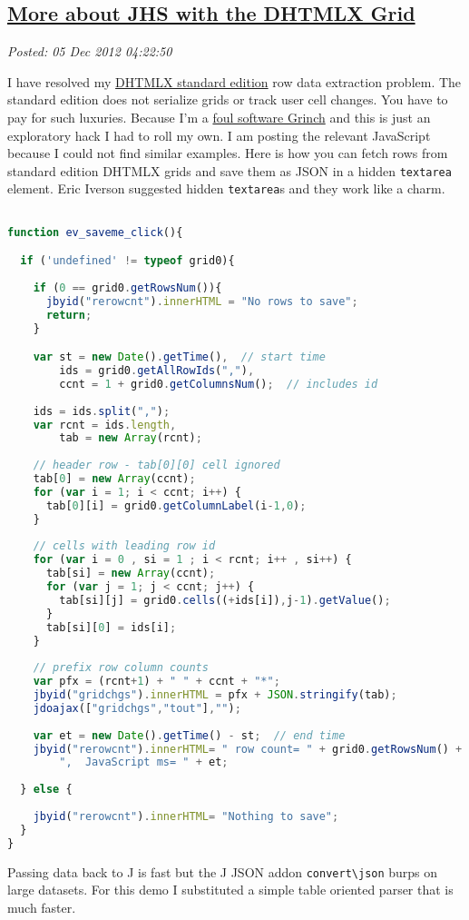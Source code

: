 %

\subsection*{\href{http://bakerjd99.wordpress.com/2012/12/04/more-about-jhs-with-dhtmlx-the-grid/}{More about JHS with the DHTMLX Grid}}


\noindent\emph{Posted: 05 Dec 2012 04:22:50}
\vspace{6pt}

I have resolved my \href{http://dhtmlx.com/docs/download.shtml}{DHTMLX
standard edition} row data extraction problem. The standard edition does
not serialize grids or track user cell changes. You have to pay for such
luxuries. Because I'm a
\href{http://www.youtube.com/watch?v=ZgP0aUKlmNw}{foul software Grinch}
and this is just an exploratory hack I had to roll my own. I am posting
the relevant JavaScript because I could not find similar examples. Here
is how you can fetch rows from standard edition DHTMLX grids and save
them as JSON in a hidden \texttt{textarea} element. Eric Iverson
suggested hidden \texttt{textarea}s and they work like a charm.


\begin{lstlisting}[language=JavaScript,frame=single,framerule=0pt,label=lst:scr3516X0]

function ev_saveme_click(){

  if ('undefined' != typeof grid0){
  
    if (0 == grid0.getRowsNum()){
      jbyid("rerowcnt").innerHTML = "No rows to save"; 
      return;
    }

    var st = new Date().getTime(),  // start time  
        ids = grid0.getAllRowIds(","),
        ccnt = 1 + grid0.getColumnsNum();  // includes id
      
    ids = ids.split(",");  
    var rcnt = ids.length,
        tab = new Array(rcnt);
    
    // header row - tab[0][0] cell ignored
    tab[0] = new Array(ccnt);  
    for (var i = 1; i < ccnt; i++) {
      tab[0][i] = grid0.getColumnLabel(i-1,0); 
    }
     
    // cells with leading row id
    for (var i = 0 , si = 1 ; i < rcnt; i++ , si++) {
      tab[si] = new Array(ccnt);
      for (var j = 1; j < ccnt; j++) {
        tab[si][j] = grid0.cells((+ids[i]),j-1).getValue();
      }
      tab[si][0] = ids[i];
    }
  
    // prefix row column counts 
    var pfx = (rcnt+1) + " " + ccnt + "*";
    jbyid("gridchgs").innerHTML = pfx + JSON.stringify(tab);
    jdoajax(["gridchgs","tout"],"");
  
    var et = new Date().getTime() - st;  // end time    
    jbyid("rerowcnt").innerHTML= " row count= " + grid0.getRowsNum() +  
        ",  JavaScript ms= " + et; 
        
  } else {
  
    jbyid("rerowcnt").innerHTML= "Nothing to save";     
  }
}
\end{lstlisting}

Passing data back to J is fast but the J JSON addon
\texttt{convert\textbackslash{}json} burps on large datasets. For this
demo I substituted a simple table oriented parser that is much faster.



%